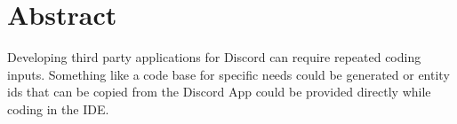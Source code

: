 \chapter{Abstract}

Developing third party applications for Discord can require repeated coding inputs.
Something like a code base for specific needs could be generated
or entity ids that can be copied from the Discord App could be provided directly while coding in the IDE.